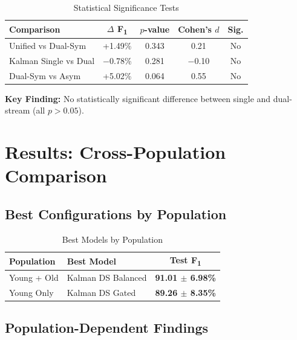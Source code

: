 \documentclass[journal,12pt]{IEEEtran}
\newcommand{\best}[1]{\textbf{\textcolor{bestresult}{#1}}}
\newcommand{\fone}{F\textsubscript{1}}
\begin{document}
\begin{table}[htbp]
\centering
\caption{Statistical Significance Tests}
\label{tab:stats}
\begin{tabular}{@{}lcccc@{}}
\toprule
\textbf{Comparison} & $\Delta$ \textbf{\fone{}} & \textbf{$p$-value} & \textbf{Cohen's $d$} & \textbf{Sig.} \\
\midrule
Unified vs Dual-Sym & +1.49\% & 0.343 & 0.21 & No \\
Kalman Single vs Dual & $-$0.78\% & 0.281 & $-$0.10 & No \\
Dual-Sym vs Asym & +5.02\% & 0.064 & 0.55 & No \\
\bottomrule
\end{tabular}
\end{table}

\textbf{Key Finding:} No statistically significant difference between single and dual-stream (all $p > 0.05$).


\section{Results: Cross-Population Comparison}
\label{sec:cross}

\subsection{Best Configurations by Population}

\begin{table}[htbp]
\centering
\caption{Best Models by Population}
\label{tab:best_pop}
\begin{tabular}{@{}llc@{}}
\toprule
\textbf{Population} & \textbf{Best Model} & \textbf{Test \fone{}} \\
\midrule
Young + Old & Kalman DS Balanced & \best{91.01 $\pm$ 6.98\%} \\
Young Only & Kalman DS Gated & \best{89.26 $\pm$ 8.35\%} \\
\bottomrule
\end{tabular}
\end{table}

\subsection{Population-Dependent Findings}
\end{document}
